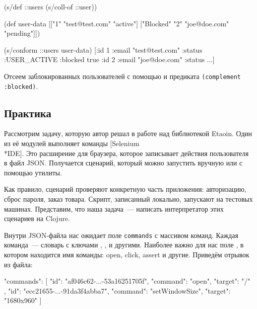 \else


\begin{clojure}
(s/def ::users (s/coll-of ::user))

(def user-data
  [["1" "test@test.com" "active"]
   ["Blocked" "2" "joe@doe.com" "pending"]])

(s/conform ::users user-data)
[{:id 1 :email "test@test.com" :status :USER_ACTIVE}
 {:blocked true :id 2 :email "joe@doe.com" :status ...}]
\end{clojure}


\fi


Отсеем заблокированных пользователей с помощью  и предиката
\texttt{(complement :blo\-cked)}.

\subsection{Практика}


\label{selenium-ide}

Рассмотрим задачу, которую автор решал в работе над библиотекой Etaoin. Один из
её модулей выполняет команды [Selenium\\*IDE].
Это расширение для браузера, которое записывает действия пользователя в файл
JSON. Получается сценарий, который можно запустить вручную или с помощью
утилиты.

Как правило, сценарий проверяют конкретную часть приложения: авторизацию, сброс
пароля, заказ товара. Скрипт, записанный локально, запускают на тестовых
машинах. Представим, что наша задача~--- написать интерпретатор этих сценариев
на Clojure.

Внутри JSON-файла нас ожидает поле \texttt{com\-mands} с массивом команд. Каждая
команда~--- словарь с ключами , ,  и
другими. Наиболее важно для нас поле , в котором находится имя
команды: open, click, assert и другие. Приведём отрывок из файла:


\begin{json}
"commands": [{
  "id": "af046c62-...-53a16251705f",
  "command": "open",
  "target": "/"
}, {
  "id": "ecc21655-...-91da3f4abba7",
  "command": "setWindowSize",
  "target": "1680x960"
}]
\end{json}



